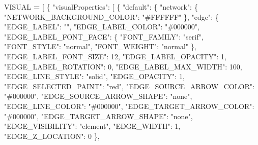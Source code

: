 \documentclass[
]{book}
\newenvironment{Shaded}{\begin{snugshade}}{\end{snugshade}}
\newcommand{\DecValTok}[1]{\textcolor[rgb]{0.00,0.00,0.81}{#1}}
\newcommand{\NormalTok}[1]{#1}
\newcommand{\OperatorTok}[1]{\textcolor[rgb]{0.81,0.36,0.00}{\textbf{#1}}}
\newcommand{\StringTok}[1]{\textcolor[rgb]{0.31,0.60,0.02}{#1}}
\begin{document}
\begin{Shaded}
\begin{Highlighting}[numbers=left,,]
\NormalTok{VISUAL }\OperatorTok{=}\NormalTok{ [}
\NormalTok{    \{}
        \StringTok{"visualProperties"}\NormalTok{: [}
\NormalTok{            \{}
                \StringTok{"default"}\NormalTok{: \{}
                    \StringTok{"network"}\NormalTok{: \{}
                        \StringTok{"NETWORK\_BACKGROUND\_COLOR"}\NormalTok{: }\StringTok{"\#FFFFFF"}
\NormalTok{                    \},}
                    \StringTok{"edge"}\NormalTok{: \{}
                        \StringTok{"EDGE\_LABEL"}\NormalTok{: }\StringTok{""}\NormalTok{,}
                        \StringTok{"EDGE\_LABEL\_COLOR"}\NormalTok{: }\StringTok{"\#000000"}\NormalTok{,}
                        \StringTok{"EDGE\_LABEL\_FONT\_FACE"}\NormalTok{: \{}
                            \StringTok{"FONT\_FAMILY"}\NormalTok{: }\StringTok{"serif"}\NormalTok{,}
                            \StringTok{"FONT\_STYLE"}\NormalTok{: }\StringTok{"normal"}\NormalTok{,}
                            \StringTok{"FONT\_WEIGHT"}\NormalTok{: }\StringTok{"normal"}
\NormalTok{                        \},}
                        \StringTok{"EDGE\_LABEL\_FONT\_SIZE"}\NormalTok{: }\DecValTok{12}\NormalTok{,}
                        \StringTok{"EDGE\_LABEL\_OPACITY"}\NormalTok{: }\DecValTok{1}\NormalTok{,}
                        \StringTok{"EDGE\_LABEL\_ROTATION"}\NormalTok{: }\DecValTok{0}\NormalTok{,}
                        \StringTok{"EDGE\_LABEL\_MAX\_WIDTH"}\NormalTok{: }\DecValTok{100}\NormalTok{,}
                        \StringTok{"EDGE\_LINE\_STYLE"}\NormalTok{: }\StringTok{"solid"}\NormalTok{,}
                        \StringTok{"EDGE\_OPACITY"}\NormalTok{: }\DecValTok{1}\NormalTok{,}
                        \StringTok{"EDGE\_SELECTED\_PAINT"}\NormalTok{: }\StringTok{"red"}\NormalTok{,}
                        \StringTok{"EDGE\_SOURCE\_ARROW\_COLOR"}\NormalTok{: }\StringTok{"\#000000"}\NormalTok{,}
                        \StringTok{"EDGE\_SOURCE\_ARROW\_SHAPE"}\NormalTok{: }\StringTok{"none"}\NormalTok{,}
                        \StringTok{"EDGE\_LINE\_COLOR"}\NormalTok{: }\StringTok{"\#000000"}\NormalTok{,}
                        \StringTok{"EDGE\_TARGET\_ARROW\_COLOR"}\NormalTok{: }\StringTok{"\#000000"}\NormalTok{,}
                        \StringTok{"EDGE\_TARGET\_ARROW\_SHAPE"}\NormalTok{: }\StringTok{"none"}\NormalTok{,}
                        \StringTok{"EDGE\_VISIBILITY"}\NormalTok{: }\StringTok{"element"}\NormalTok{,}
                        \StringTok{"EDGE\_WIDTH"}\NormalTok{: }\DecValTok{1}\NormalTok{,}
                        \StringTok{"EDGE\_Z\_LOCATION"}\NormalTok{: }\DecValTok{0}
\NormalTok{                    \},}

\end{Highlighting}
\end{Shaded}
\end{document}

